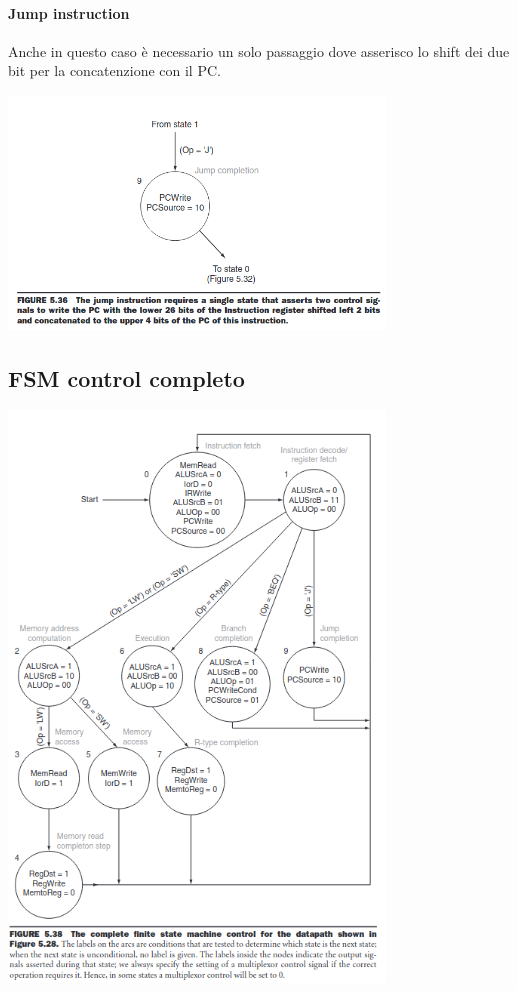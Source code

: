 \documentclass[12pt, a4paper, openany]{book}
\begin{document}
\paragraph*{Jump instruction}
Anche in questo caso è necessario un solo passaggio dove asserisco lo shift dei due bit per la concatenzione
con il PC.
\begin{center}
    \includegraphics[width=100mm, scale=0.5]{Jump Automa.png}
\end{center}

\subsection*{FSM control completo}
\begin{center}
    \includegraphics[width=100mm, scale=0.5]{Complete Automa.png}
\end{center}
\end{document}
